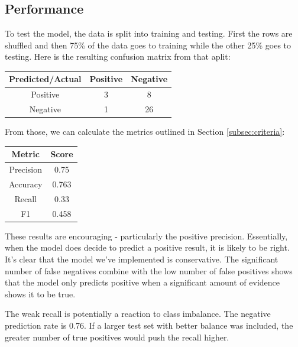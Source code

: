 \documentclass[11pt, twoside, reqno]{article}
\begin{document}
\subsection{Performance}
\hspace{0.2in} To test the model, the data is split into training and testing. First the rows are shuffled and then 75\% of the data goes to training while the other 25\% goes to testing. Here is the resulting confusion matrix from that aplit:
\begin{center}
\begin{tabular}{|c|c|c|}
	\hline
	Predicted/Actual & Positive & Negative \\
	\hline
	Positive & 3 & 8 \\
	\hline
	Negative & 1 &  26\\
	\hline
\end{tabular}
\end{center}
From those, we can calculate the metrics outlined in Section \ref{subsec:criteria}:
\begin{center}
\begin{tabular}{|c|c|}
	\hline
	Metric & Score \\
	\hline
	Precision & 0.75 \\
	\hline
	Accuracy & 0.763\\
	\hline
	Recall & 0.33 \\
	\hline
	F1 & 0.458 \\
	\hline
\end{tabular}
\end{center}

These results are encouraging - particularly the positive precision. Essentially, when the model does decide to predict a positive result, it is likely to be right. It's clear that the model we've implemented is conservative. The significant number of false negatives combine with the low number of false positives shows that the model only predicts positive when a significant amount of evidence shows it to be true. 

The weak recall is potentially a reaction to class imbalance. The negative prediction rate is 0.76. If a larger test set with better balance was included, the greater number of true positives would push the recall higher. 
\end{document}
